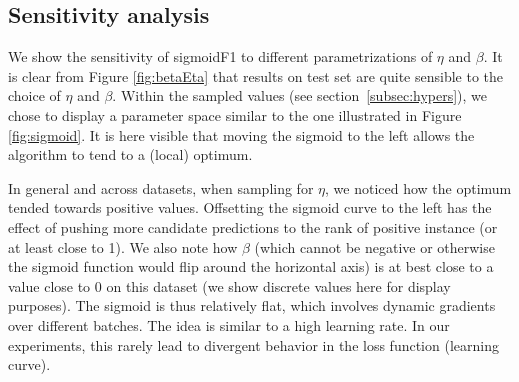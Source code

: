 \subsection{Sensitivity analysis}

We show the sensitivity of sigmoidF1 to different parametrizations of $\eta$ and $\beta$. It is clear from Figure \ref{fig:betaEta} that results on test set are quite sensible to the choice of $\eta$ and $\beta$. Within the sampled values (see section~\ref{subsec:hypers}), we chose to display a parameter space similar to the one illustrated in Figure \ref{fig:sigmoid}. It is here visible that moving the sigmoid to the left allows the algorithm to tend to a (local) optimum.

In general and across datasets, when sampling for $\eta$, we noticed how the optimum tended towards positive values. Offsetting the sigmoid curve to the left has the effect of pushing more candidate predictions to the rank of positive instance (or at least close to 1). We also note how $\beta$ (which cannot be negative or otherwise the sigmoid function would flip around the horizontal axis) is at best close to a value close to 0 on this dataset (we show discrete values here for display purposes). The sigmoid is thus relatively flat, which involves dynamic gradients over different batches. The idea is similar to a high learning rate. In our experiments, this rarely lead to divergent behavior in the loss function (learning curve).







